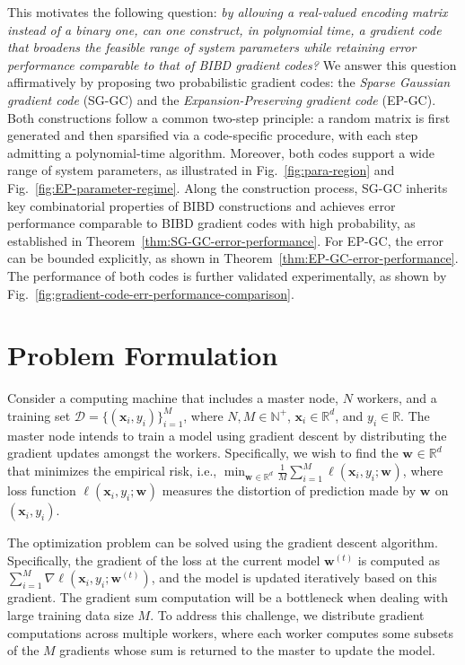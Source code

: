 \documentclass[lettersize,journal]{IEEEtran}
\newcommand{\xx}[1]{\boldsymbol{x}_{#1}}
\newcommand{\ww}[1]{\boldsymbol{w}_{#1}}
\newcommand{\RR}{\mathbb{R}}
\newcommand{\NN}{\mathbb{N}}
\begin{document}
This motivates the following question: \emph{by allowing a real-valued encoding matrix instead of a binary one, can one construct, in polynomial time, a gradient code that broadens the feasible range of system parameters while retaining error performance comparable to that of BIBD gradient codes?} We answer this question affirmatively by proposing two probabilistic gradient codes: the \emph{Sparse Gaussian gradient code} (SG-GC) and the \emph{Expansion-Preserving gradient code} (EP-GC). Both constructions follow a common two-step principle: a random matrix is first generated and then sparsified via a code-specific procedure, with each step admitting a polynomial-time algorithm. Moreover, both codes support a wide range of system parameters, as illustrated in Fig.~\ref{fig:para-region} and Fig.~\ref{fig:EP-parameter-regime}. Along the construction process, SG-GC inherits key combinatorial properties of BIBD constructions and achieves error performance comparable to BIBD gradient codes with high probability, as established in Theorem~\ref{thm:SG-GC-error-performance}. For EP-GC, the error can be bounded explicitly, as shown in Theorem~\ref{thm:EP-GC-error-performance}. The performance of both codes is further validated experimentally, as shown by Fig.~\ref{fig:gradient-code-err-performance-comparison}.

\section{Problem Formulation}

Consider a computing machine that includes a master node, 
 $N$ workers, and a training set $\mathcal{D} = \{(\xx{i}, y_i)\}_{i=1}^M$,  where $N, M\in \NN^+$, $\xx{i}\in\RR^d$, and $y_i\in\RR$. The master node intends to train a model using gradient descent by distributing the gradient updates amongst the workers. Specifically, we wish to find the $\ww{}\in\RR^d$ that minimizes the empirical risk, i.e., $\min_{\ww{}\in \RR^d}\frac{1}{M}\sum^{M}_{i=1}\ell(\xx{i}, y_i; \ww{})$, where loss function $\ell(\xx{i}, y_i; \ww{})$ measures the distortion of prediction made by $\ww{}$ on $(\xx{i},y_i)$.

The optimization problem can be solved using the gradient descent algorithm. Specifically, the gradient of the loss at the current model $\ww{}^{(t)}$ is computed as $\sum^M_{i=1}\nabla\ell(\xx{i}, y_i; \ww{}^{(t)})$, and the model is updated iteratively based on this gradient. The gradient sum computation will be a bottleneck when dealing with large training data size $M$. To address this challenge, we distribute gradient computations across multiple workers, where each worker computes some subsets of the $M$ gradients whose sum is returned to the master to update the model.
 
\end{document}
